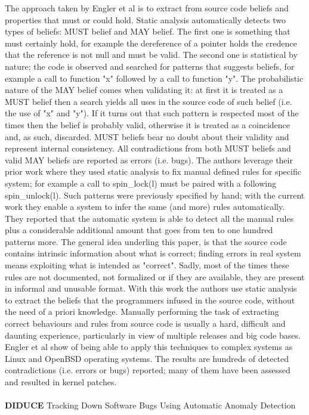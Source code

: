 The approach taken by Engler et al is to extract from source code beliefs and properties that must or could hold. Static analysis automatically detects two types of beliefs: MUST belief and MAY belief. The first one is something that must certainly hold, for example the dereference of a pointer holds the credence that the reference is not null and must be valid. The second one is statistical by nature; the code is observed and searched for patterns that suggests beliefs, for example a call to function "x" followed by a call to function "y". The probabilistic nature of the MAY belief comes when validating it: at first it is treated as a MUST belief then a search yields all uses in the source code of such belief (i.e. the use of "x" and "y"). If it turns out that such pattern is respected most of the times then the belief is probably valid, otherwise it is treated as a coincidence and, as such, discarded.
MUST beliefs bear no doubt about their validity and represent internal consistency. All contradictions from both MUST beliefs and valid MAY beliefs are reported as errors (i.e. bugs).
The authors leverage their prior work \cite{engler2000checking} where they used static analysis to fix manual defined rules for specific system; for example a call to spin\_lock(l) must be paired with a following spin\_unlock(l). Such patterns were previously specified by hand; with the current work they enable a system to infer the same (and more) rules automatically. They reported that the automatic system is able to detect all the manual rules plus a considerable additional amount that goes from ten to one hundred patterns more.
The general idea underling this paper, is that the source code contains intrinsic information about what is correct; finding errors in real system means exploiting what is intended as "correct". Sadly, most of the times these rules are not documented, not formalized or if they are available, they are present in informal and unusable format.
With this work the authors use static analysis to extract the beliefs that the programmers infused in the source code, without the need of a priori knowledge.
Manually performing the task of extracting correct behaviours and rules from source code is usually a hard, difficult and daunting experience, particularly in view of multiple releases and big code bases. Engler et al show of being able to apply this techniques to complex systems as Linux and OpenBSD operating systems. The results are hundreds of detected contradictions (i.e. errors or bugs) reported; many of them have been assessed and resulted in kernel patches.
\\
\\
\textbf{DIDUCE} \cite{hangal2002tracking} Tracking Down Software Bugs Using Automatic Anomaly Detection

